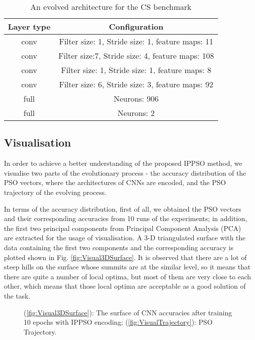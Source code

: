 \documentclass[conference]{IEEEtran}
\begin{document}
\begin{table}[!t]
	\renewcommand{\arraystretch}{1.3}
	\caption{An evolved architecture for the CS benchmark}
	\label{table:EvolvedConvexCNN}
	\centering
	\begin{tabular}{|c|c|}
		\hline
		Layer type & Configuration\\
		\hline
		conv & Filter size: 1, Stride size: 1, feature maps: 11\\
		\hline
		conv & Filter size:7, Stride size: 4, feature maps: 108\\
		\hline
		conv & Filter size: 1, Stride size: 1, feature maps: 8\\
		\hline
		conv & Filter size: 6, Stride size: 3, feature maps: 92\\
		\hline
		full & Neurons: 906\\
		\hline
		full & Neurons: 2\\
		\hline
	\end{tabular}
\end{table}

\subsection{Visualisation}\label{sec:Visulisation}

In order to achieve a better understanding of the proposed IPPSO method, we visualise two parts of the evolutionary process - the accuracy distribution of the PSO vectors, where the architectures of CNNs are encoded, and the PSO trajectory of the evolving process.


In terms of the accuracy distribution, first of all, we obtained the PSO vectors and their corresponding accuracies from 10 runs of the experiments; in addition, the first two principal components from Principal Component Analysis (PCA) are extracted for the usage of visualisation. A 3-D triangulated surface with the data containing the first two components and the corresponding accuracy is plotted shown in Fig. \ref{fig:Visual3DSurface}. It is observed that there are a lot of steep hills on the surface whose summits are at the similar level, so it means that there are quite a number of local optima, but most of them are very close to each other, which means that those local optima are acceptable as a good solution of the task.


\begin{figure}[!htp]
	\centering
	\hfil

	\caption{(\ref{fig:Visual3DSurface}): The surface of CNN accuracies after training 10 epochs with IPPSO encoding; (\ref{fig:VisualTrajectory}): PSO Trajectory.}
\end{figure}
\end{document}
